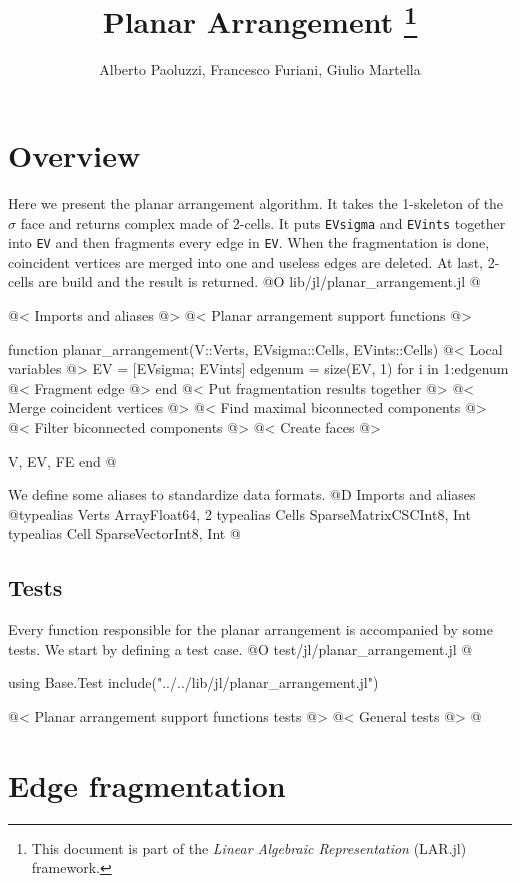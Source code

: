 \documentclass[10pt,oneside]{article}
\author{Alberto Paoluzzi, Francesco Furiani, Giulio Martella}
\title{Planar Arrangement
\footnote{This document is part of the \emph{Linear Algebraic Representation} (LAR.jl) framework.}
}
\begin{document}
\maketitle
\newpage
\tableofcontents
\newpage









\section{Overview}
Here we present the planar arrangement algorithm. It takes the 1-skeleton of the $\sigma$ face and returns complex made of 2-cells.
It puts \texttt{EVsigma} and \texttt{EVints} together into \texttt{EV} and then fragments every edge in \texttt{EV}. 
When the fragmentation is done, coincident vertices are merged into one and useless edges are deleted. At last,
2-cells are build and the result is returned.
@O lib/jl/planar_arrangement.jl
@{@< Imports and aliases @>
@< Planar arrangement support functions @>

function planar_arrangement(V::Verts, EVsigma::Cells, EVints::Cells)
    @< Local variables @>
    EV = [EVsigma; EVints]
    edgenum = size(EV, 1)
    for i in 1:edgenum
        @< Fragment edge @>
    end
    @< Put fragmentation results together @>
    @< Merge coincident vertices @>
    @< Find maximal biconnected components @>
    @< Filter biconnected components @>
    @< Create faces @>

    V, EV, FE
end 
@}
We define some aliases to standardize data formats.
@D Imports and aliases
@{typealias Verts Array{Float64, 2}
typealias Cells SparseMatrixCSC{Int8, Int}
typealias Cell SparseVector{Int8, Int}
@}
\subsection{Tests}
Every function responsible for the planar arrangement is accompanied by some tests.
We start by defining a test case.
@O test/jl/planar_arrangement.jl
@{using Base.Test
include("../../lib/jl/planar_arrangement.jl")

@< Planar arrangement support functions tests @>
@< General tests @>
@}










\section{Edge fragmentation}
\end{document}
